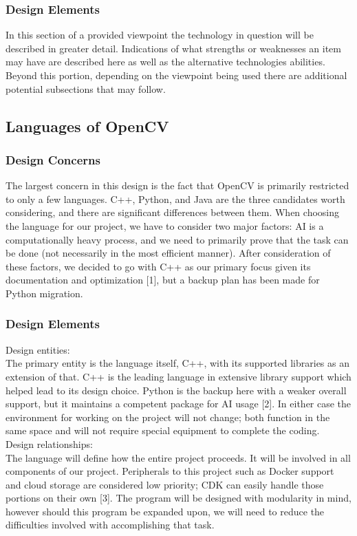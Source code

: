 \documentclass[onecolumn, draftclsnofoot,10pt, compsoc]{IEEEtran}
\begin{document}
\subsubsection{Design Elements}
In this section of a provided viewpoint the technology in question will be described in greater detail. Indications of what strengths or weaknesses an item may have are described here as well as the alternative technologies abilities. Beyond this portion, depending on the viewpoint being used there are additional potential subsections that may follow.

\subsection{Languages of OpenCV}
\subsubsection{Design Concerns}
The largest concern in this design is the fact that OpenCV is primarily restricted to only a few languages. C++, Python, and Java are the three candidates worth considering, and there are significant differences between them. When choosing the language for our project, we have to consider two major factors: AI is a computationally heavy process, and we need to primarily prove that the task can be done (not necessarily in the most efficient manner). After consideration of these factors, we decided to go with C++ as our primary focus given its documentation and optimization [1], but a backup plan has been made for Python migration.

\subsubsection{Design Elements}
	Design entities: \\
The primary entity is the language itself, C++, with its supported libraries as an extension of that. C++ is the leading language in extensive library support which helped lead to its design choice. Python is the backup here with a weaker overall support, but it maintains a competent package for AI usage [2]. In either case the environment for working on the project will not change; both function in the same space and will not require special equipment to complete the coding.\\

		Design relationships:\\
The language will define how the entire project proceeds. It will be involved in all components of our project. Peripherals to this project such as Docker support and cloud storage are considered low priority; CDK can easily handle those portions on their own [3]. The program will be designed with modularity in mind, however should this program be expanded upon, we will need to reduce the difficulties involved with accomplishing that task.\\
\end{document}
